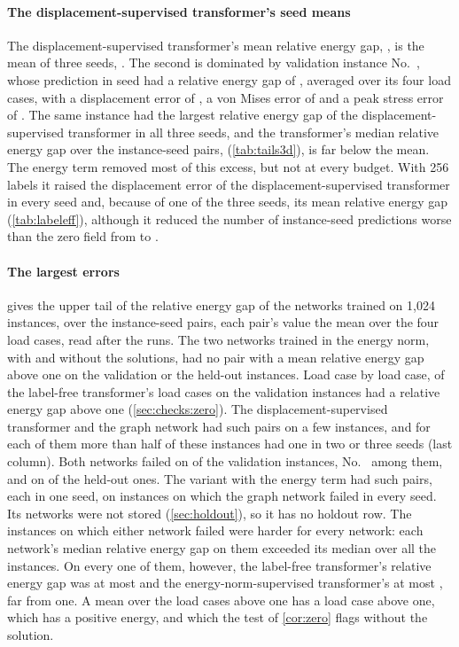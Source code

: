 \paragraph{The displacement-supervised transformer's seed means}
The displacement-supervised transformer's mean relative energy gap, \numThreeLabGapMs{}, is
the mean of three seeds, \numThreeLabGapSeeds{}. The second is dominated by validation
instance No.~\numWorstIndex{}, whose prediction in seed \numThreeLabWorstSeed{} had a
relative energy gap of \numThreeLabWorst{}, averaged over its four load cases, with a
displacement error of \numWorstSeedLabDisp{}, a von Mises error of \numWorstSeedLabVm{} and
a peak stress error of \numWorstSeedLabPeak{}. The same instance had the largest relative
energy gap of the displacement-supervised transformer in all three seeds, and the
transformer's median relative energy gap over the instance-seed pairs,
\numThreeLabGapMedian{} (\cref{tab:tails3d}), is far below the mean. The energy term removed most of this excess, but not at every budget. With 256 labels it raised the displacement
error of the displacement-supervised transformer in every seed and, because of one of the
three seeds, its mean relative energy gap (\cref{tab:labeleff}), although it reduced the number of
instance-seed predictions worse than the zero field from \numThreeLabWorseTwoFiveSix{} to
\numThreeAncWorseTwoFiveSix{}.

\paragraph{The largest errors}
 gives the upper tail of the relative energy gap of the networks trained on
1,024 instances, over the instance-seed pairs, each pair's value the mean over the four load
cases, read after the runs. The two networks trained in the energy norm, with and without
the solutions, had no pair with a mean relative energy gap above one on the validation or the held-out instances. Load case by load case, \numTailThreeFreeLoad{} of the label-free
transformer's load cases on the validation instances had a relative energy gap above one
(\cref{sec:checks:zero}).
The displacement-supervised transformer and the graph network had such pairs on a few
instances, and for each of them more than half of these instances had one in two or three seeds (last column). Both networks failed on \numTailThreeValShared{} of the validation instances,
No.~\numWorstIndex{} among them, and on \numTailThreeHoldShared{} of the held-out ones. The variant with the energy term had \numTailThreeAncWorse{} such pairs,
each in one seed, on instances on which the graph network failed in every seed. Its networks were not stored (\cref{sec:holdout}), so it has no holdout row. The instances on
which either network failed were harder for every network: each network's median relative energy gap on them exceeded its
median over all the instances. On every one of them, however, the label-free transformer's relative energy gap was at
most \numTailThreeFreeMax{} and the energy-norm-supervised transformer's at most
\numTailThreeKnormMax{}, far from one. A mean over the load cases above one has a load case
above one, which has a positive energy, and which the test of \cref{cor:zero} flags without
the solution.


